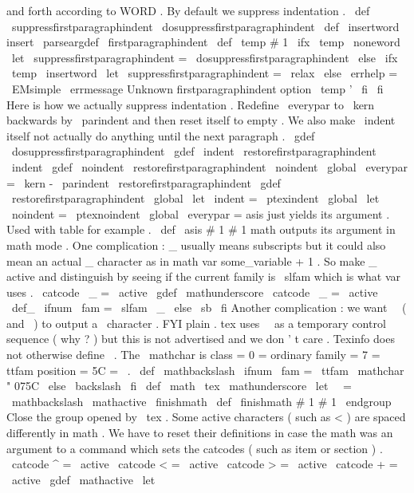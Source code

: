 {and
forth
according
to
WORD
.
%
By
default
we
suppress
indentation
.
%
\
def
\
suppressfirstparagraphindent
{
\
dosuppressfirstparagraphindent
}
\
def
\
insertword
{
insert
}
%
\
parseargdef
\
firstparagraphindent
{
%
\
def
\
temp
{
#
1
}
%
\
ifx
\
temp
\
noneword
\
let
\
suppressfirstparagraphindent
=
\
dosuppressfirstparagraphindent
\
else
\
ifx
\
temp
\
insertword
\
let
\
suppressfirstparagraphindent
=
\
relax
\
else
\
errhelp
=
\
EMsimple
\
errmessage
{
Unknown
firstparagraphindent
option
\
temp
'
}
%
\
fi
\
fi
}
%
Here
is
how
we
actually
suppress
indentation
.
Redefine
\
everypar
to
%
\
kern
backwards
by
\
parindent
and
then
reset
itself
to
empty
.
%
%
We
also
make
\
indent
itself
not
actually
do
anything
until
the
next
%
paragraph
.
%
\
gdef
\
dosuppressfirstparagraphindent
{
%
\
gdef
\
indent
{
%
\
restorefirstparagraphindent
\
indent
}
%
\
gdef
\
noindent
{
%
\
restorefirstparagraphindent
\
noindent
}
%
\
global
\
everypar
=
{
%
\
kern
-
\
parindent
\
restorefirstparagraphindent
}
%
}
\
gdef
\
restorefirstparagraphindent
{
%
\
global
\
let
\
indent
=
\
ptexindent
\
global
\
let
\
noindent
=
\
ptexnoindent
\
global
\
everypar
=
{
}
%
}
%
asis
just
yields
its
argument
.
Used
with
table
for
example
.
%
\
def
\
asis
#
1
{
#
1
}
%
math
outputs
its
argument
in
math
mode
.
%
%
One
complication
:
_
usually
means
subscripts
but
it
could
also
mean
%
an
actual
_
character
as
in
math
{
var
{
some_variable
}
+
1
}
.
So
make
%
_
active
and
distinguish
by
seeing
if
the
current
family
is
\
slfam
%
which
is
what
var
uses
.
{
\
catcode
\
_
=
\
active
\
gdef
\
mathunderscore
{
%
\
catcode
\
_
=
\
active
\
def_
{
\
ifnum
\
fam
=
\
slfam
\
_
\
else
\
sb
\
fi
}
%
}
}
%
Another
complication
:
we
want
\
\
(
and
\
)
to
output
a
\
character
.
%
FYI
plain
.
tex
uses
\
\
as
a
temporary
control
sequence
(
why
?
)
but
%
this
is
not
advertised
and
we
don
'
t
care
.
Texinfo
does
not
%
otherwise
define
\
.
%
%
The
\
mathchar
is
class
=
0
=
ordinary
family
=
7
=
ttfam
position
=
5C
=
\
.
\
def
\
mathbackslash
{
\
ifnum
\
fam
=
\
ttfam
\
mathchar
"
075C
\
else
\
backslash
\
fi
}
%
\
def
\
math
{
%
\
tex
\
mathunderscore
\
let
\
\
=
\
mathbackslash
\
mathactive
\
finishmath
}
\
def
\
finishmath
#
1
{
#
1
\
endgroup
}
%
Close
the
group
opened
by
\
tex
.
%
Some
active
characters
(
such
as
<
)
are
spaced
differently
in
math
.
%
We
have
to
reset
their
definitions
in
case
the
math
was
an
argument
%
to
a
command
which
sets
the
catcodes
(
such
as
item
or
section
)
.
%
{
\
catcode
^
=
\
active
\
catcode
<
=
\
active
\
catcode
>
=
\
active
\
catcode
+
=
\
active
\
gdef
\
mathactive
{
%
\
let
}}}
